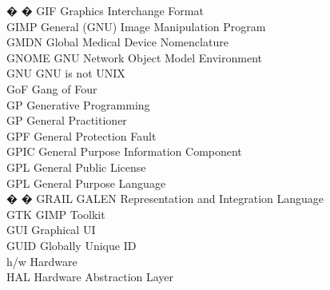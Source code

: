 \begin{tabbing}


� � \>GIF \>\>Graphics Interchange Format\\

    \>GIMP \>\>General (GNU) Image Manipulation Program\\

    \>GMDN \>\>Global Medical Device Nomenclature\\

    \>GNOME \>\>GNU Network Object Model Environment\\

    \>GNU \>\>GNU is not UNIX\\

    \>GoF \>\>Gang of Four\\

    \>GP \>\>Generative Programming\\

    \>GP \>\>General Practitioner\\

    \>GPF \>\>General Protection Fault\\

    \>GPIC \>\>General Purpose Information Component\\

    \>GPL \>\>General Public License\\

    \>GPL \>\>General Purpose Language\\


� � \>GRAIL \>\>GALEN Representation and Integration Language\\

    \>GTK \>\>GIMP Toolkit\\

    \>GUI \>\>Graphical UI\\

    \>GUID \>\>Globally Unique ID\\

    \>h/w \>\>Hardware\\

    \>HAL \>\>Hardware Abstraction Layer\\


\end{tabbing}
